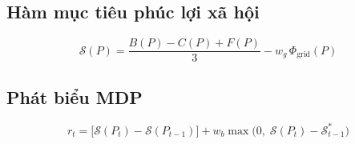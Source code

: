\documentclass[10pt, conference, a4paper, compsocconf]{IEEEtran}
\begin{document}
\subsection{Hàm mục tiêu phúc lợi xã hội}
\begin{equation}
\label{eq:score}
\mathcal{S}(P) = \frac{B(P) - C(P) + F(P)}{3} - w_g\,\Phi_{\text{grid}}(P)
\end{equation}

\subsection{Phát biểu MDP}
\begin{equation}
\label{eq:reward}
r_t = \big[\mathcal{S}(P_t)-\mathcal{S}(P_{t-1})\big] + w_b\max\big(0,\;\mathcal{S}(P_t)-\mathcal{S}^{*}_{t-1}\big)
\end{equation}
\end{document}
